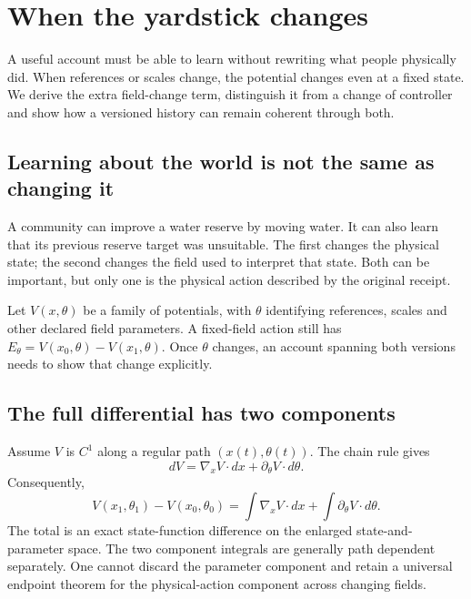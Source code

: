 \chapter{When the yardstick changes}\label{ch:moving-field}

A useful account must be able to learn without rewriting what people physically did. When references or scales change, the potential changes even at a fixed state. We derive the extra field-change term, distinguish it from a change of controller and show how a versioned history can remain coherent through both.


\section{Learning about the world is not the same as changing it}
A community can improve a water reserve by moving water. It can also learn that its previous reserve target was unsuitable. The first changes the physical state; the second changes the field used to interpret that state. Both can be important, but only one is the physical action described by the original receipt.

Let $V(x,\theta)$ be a family of potentials, with $\theta$ identifying references, scales and other declared field parameters. A fixed-field action still has $E_\theta=V(x_0,\theta)-V(x_1,\theta)$. Once $\theta$ changes, an account spanning both versions needs to show that change explicitly.

\section{The full differential has two components}
Assume $V$ is $C^1$ along a regular path $(x(t),\theta(t))$. The chain rule gives
\begin{equation}\label{eq:moving-differential}
 dV=\nabla_xV\cdot dx+\partial_\theta V\cdot d\theta.
\end{equation}
Consequently,
\begin{equation}\label{eq:moving-integral}
 V(x_1,\theta_1)-V(x_0,\theta_0)
 =\int\nabla_xV\cdot dx+\int\partial_\theta V\cdot d\theta.
\end{equation}
The total is an exact state-function difference on the enlarged state-and-parameter space. The two component integrals are generally path dependent separately. One cannot discard the parameter component and retain a universal endpoint theorem for the physical-action component across changing fields.

